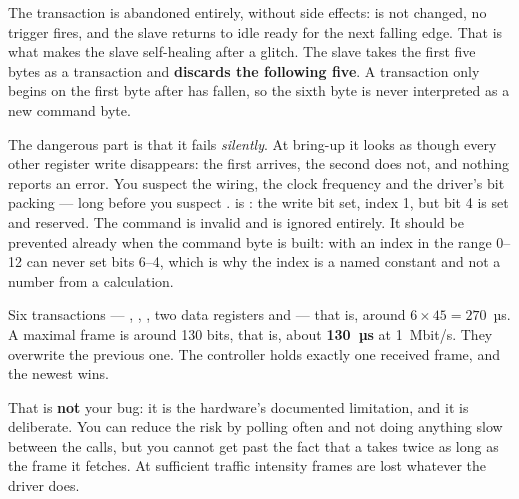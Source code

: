  The transaction is abandoned entirely, without side effects:  is not changed,
no trigger fires, and the slave returns to idle ready for the next falling  edge. That is
what makes the slave self-healing after a glitch.
 The slave takes the first five bytes as a transaction and \textbf{discards the following
five}. A transaction only begins on the first byte after  has fallen, so the sixth byte
is never interpreted as a new command byte.

The dangerous part is that it fails \emph{silently}. At bring-up it looks as though every other
register write disappears: the first arrives, the second does not, and nothing reports an error.
You suspect the wiring, the clock frequency and the driver's bit packing --- long before you
suspect .
  is : the write bit set, index 1, but bit 4 is set and
reserved. The command is invalid and is ignored entirely. It should be prevented already when the
command byte is built:  with an index in the range 0--12 can never set bits
6--4, which is why the index is a named constant and not a number from a calculation.

 Six transactions --- , , , two data registers and
 --- that is, around $6 \times 45 = 270$~µs.
 A maximal frame is around 130 bits, that is, about \textbf{130~µs} at 1~Mbit/s.
 They overwrite the previous one. The controller holds exactly one received frame, and the
newest wins.

That is \textbf{not} your bug: it is the hardware's documented limitation, and it is deliberate.
You can reduce the risk by polling often and not doing anything slow between the calls, but you
cannot get past the fact that a  takes twice as long as the frame it fetches. At
sufficient traffic intensity frames are lost whatever the driver does.
